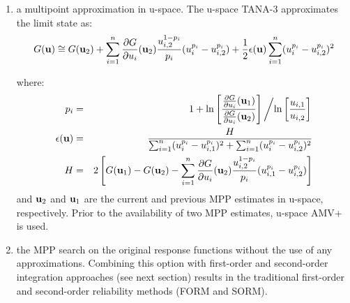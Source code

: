 \begin{enumerate}
\item a multipoint approximation in u-space. The u-space TANA-3
approximates the limit state as:
\begin{equation}
G({\bf u}) \cong G({\bf u}_2) + \sum_{i=1}^n 
\frac{\partial G}{\partial u_i}({\bf u}_2) \frac{u_{i,2}^{1-p_i}}{p_i} 
(u_i^{p_i} - u_{i,2}^{p_i}) + \frac{1}{2} \epsilon({\bf u}) \sum_{i=1}^n 
(u_i^{p_i} - u_{i,2}^{p_i})^2 \label{eq:tana_G}
\end{equation}

\noindent where:
\begin{eqnarray}
p_i & = & 1 + \ln \left[ \frac{\frac{\partial G}{\partial u_i}({\bf u}_1)}
{\frac{\partial G}{\partial u_i}({\bf u}_2)} \right] \left/ 
\ln \left[ \frac{u_{i,1}}{u_{i,2}} \right] \right. \label{eq:tana_pi_u} \\
\epsilon({\bf u}) & = & \frac{H}{\sum_{i=1}^n (u_i^{p_i} - u_{i,1}^{p_i})^2 + 
\sum_{i=1}^n (u_i^{p_i} - u_{i,2}^{p_i})^2} \label{eq:tana_eps_u} \\
H & = & 2 \left[ G({\bf u}_1) - G({\bf u}_2) - \sum_{i=1}^n 
\frac{\partial G}{\partial u_i}({\bf u}_2) \frac{u_{i,2}^{1-p_i}}{p_i} 
(u_{i,1}^{p_i} - u_{i,2}^{p_i}) \right] \label{eq:tana_H_u}
\end{eqnarray}
\noindent and ${\bf u}_2$ and ${\bf u}_1$ are the current and previous
MPP estimates in u-space, respectively.  Prior to the availability of
two MPP estimates, u-space AMV+ is used.

\item the MPP search on the original response functions without the 
use of any approximations.  Combining this option with first-order and
second-order integration approaches (see next section) results in the
traditional first-order and second-order reliability methods (FORM and
SORM).
\end{enumerate}


